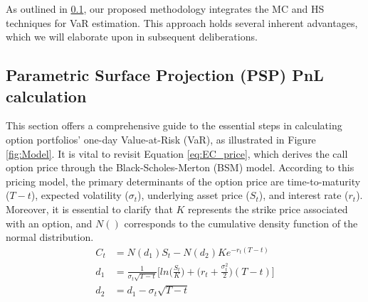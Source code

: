 As outlined in \ref{sec:PSP}, our proposed methodology integrates the MC and HS techniques for VaR estimation. This approach holds several inherent advantages, which we will elaborate upon in subsequent deliberations.

\subsection{Parametric Surface Projection (PSP) PnL calculation}\label{sec:PSP}

This section offers a comprehensive guide to the essential steps in calculating option portfolios' one-day Value-at-Risk (VaR), as illustrated in Figure \ref{fig:Model}. It is vital to revisit Equation \eqref{eq:EC_price}, which derives the call option price through the Black-Scholes-Merton (BSM) model. According to this pricing model, the primary determinants of the option price are time-to-maturity ($T-t$), expected volatility ($\sigma_t$), underlying asset price ($S_t$), and interest rate ($r_t$). Moreover, it is essential to clarify that $K$ represents the strike price associated with an option, and $N()$ corresponds to the cumulative density function of the normal distribution.
\begin{align}
    C_t &= N(d_1)S_t - N(d_2)Ke^{-r_t(T-t)} \label{eq:EC_price}\\
    d_1 &= \frac{1}{\sigma_t \sqrt{T-t}} \Big[ln\Big(\frac{S_t}{K}\Big) + \Big(r_t+\frac{\sigma_t^2}{2}\Big)(T-t)\Big] \nonumber \\
    d_2 &= d_1 - \sigma_t \sqrt{T-t} \nonumber
\end{align}

